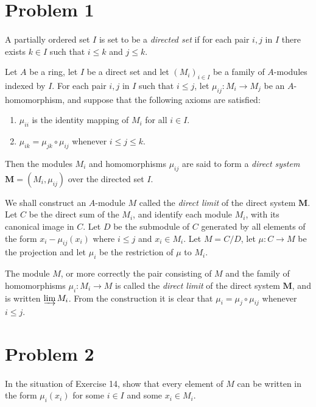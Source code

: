 \documentclass{article}
\begin{document}
\section*{Problem 1}\paragraph{}
A partially ordered set $I$ is set to be a \textit{directed set} if for each pair $i, j$ in $I$ there exists $k\in I$ such that $i\leq k$ and $j\leq k$.

Let $A$ be a ring, let $I$ be a direct set and let $(M_i)_{i\in I}$ be a family of $A$-modules indexed by $I$. For each pair $i, j$ in $I$ such that $i\leq j$, let $\mu_{ij}:M_i\to M_j$ be an $A$-homomorphism, and suppose that the following axioms are satisfied:

\begin{enumerate}
    \item $\mu_{ii}$ is the identity mapping of $M_i$ for all $i\in I$.
    \item $\mu_{ik}=\mu_{jk}\circ\mu_{ij}$ whenever $i\leq j\leq k$.
\end{enumerate}

Then the modules $M_i$ and homomorphisms $\mu_{ij}$ are said to form a \textit{direct system} $\mathbf{M}=(M_i,\mu_{ij})$ over the directed set $I$.

We shall construct an $A$-module $M$ called the \textit{direct limit} of the direct system $\mathbf{M}$. Let $C$ be the direct sum of the $M_i$, and identify each module $M_i$, with its canonical image in $C$. Let $D$ be the submodule of $C$ generated by all elements of the form $x_i-\mu_{ij}(x_i)$ where $i\leq j$ and $x_i\in M_i$. Let $M = C/D$, let $\mu:C\to M$ be the projection and let $\mu_i$ be the restriction of $\mu$ to $M_i$.

The module $M$, or more correctly the pair consisting of $M$ and the family of homomorphisms $\mu_i:M_i\to M$ is called the \textit{direct limit} of the direct system $\mathbf{M}$, and is written $\varinjlim M_i$. From the construction it is clear that $\mu_i=\mu_j\circ\mu_{ij}$ whenever $i\leq j$.

\section*{Problem 2}\paragraph{}
In the situation of Exercise 14, show that every element of $M$ can be written in the form $\mu_i(x_i)$ for some $i\in I$ and some $x_i\in M_i$.
\end{document}

